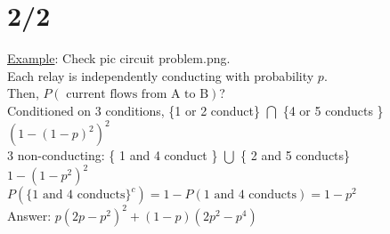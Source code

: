 \section*{2/2}
  \underline{Example}: Check pic circuit problem.png.\\
  Each relay is independently conducting with probability $p$.\\
  Then, $P(\text{ current flows from A to B})$?\\
  Conditioned on 3 conditions, \{1 or 2 conduct\} $\bigcap$ \{4 or 5 conducts 
  \}\\
  $(1 - (1-p)^2)^2 $\\
  3 non-conducting: \{ 1 and 4 conduct \} $\bigcup$ \{ 2 and 5 conducts\}\\
  $1 - (1-p^2)^2$\\
  $P(\{\text{1 and 4 conducts}\}^c) = 1 - P(\text{1 and 4 conducts}) = 1 -
  p^2$\\
  Answer: $p(2p - p^2)^2 + (1-p)(2p^2 - p^4)$\\\\
